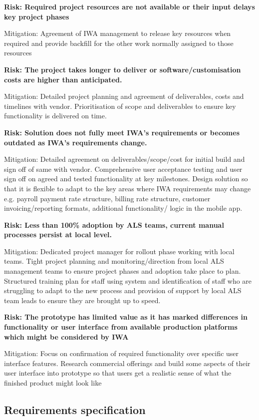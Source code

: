 \documentclass[a4paper,12pt]{article}
\begin{document}
\begin{samepage}
\noindent\makebox[\linewidth]{\rule{\paperwidth}{0.4pt}}
\textbf{Risk: Required project resources are not available or their input delays key project phases}

Mitigation: Agreement of IWA management to release key resources when required and provide backfill for the other work normally assigned to those resources

\noindent\makebox[\linewidth]{\rule{\paperwidth}{0.4pt}}
\textbf{Risk: The project takes longer to deliver or software/customisation costs are higher than anticipated.}

Mitigation: Detailed project planning and agreement of deliverables, costs and timelines with vendor. Prioritisation of scope and deliverables to ensure key functionality is delivered on time. 

\noindent\makebox[\linewidth]{\rule{\paperwidth}{0.4pt}}
\textbf{Risk: Solution does not fully meet IWA's requirements or becomes outdated as IWA's requirements change.}

Mitigation: Detailed agreement on deliverables/scope/cost for initial build and sign off of same with vendor. Comprehensive user acceptance testing and user sign off on agreed and tested functionality at key milestones. Design solution so that it is flexible to adapt to the key areas where IWA requirements may change e.g. payroll payment rate structure, billing rate structure, customer invoicing/reporting formats, additional functionality/ logic in the mobile app.

\noindent\makebox[\linewidth]{\rule{\paperwidth}{0.4pt}}
\textbf{Risk: Less than 100\% adoption by ALS teams, current manual processes persist at local level.}

Mitigation: Dedicated project manager for rollout phase working with local teams. Tight project planning and monitoring/direction from local ALS management teams to ensure project phases and adoption take place to plan. Structured training plan for staff using system and identification of staff who are struggling to adapt to the new process and provision of support by local ALS team leads to ensure they are brought up to speed.

\noindent\makebox[\linewidth]{\rule{\paperwidth}{0.4pt}}
\textbf{Risk: The prototype has limited value as it has marked differences in functionality or user interface from available production platforms which might be considered by IWA}

Mitigation: Focus on confirmation of required functionality over specific user interface features. Research commercial offerings and build some aspects of their user interface into prototype so that users get a realistic sense of what the finished product might look like

\subsection{Requirements specification}
\end{samepage}
\end{document}

